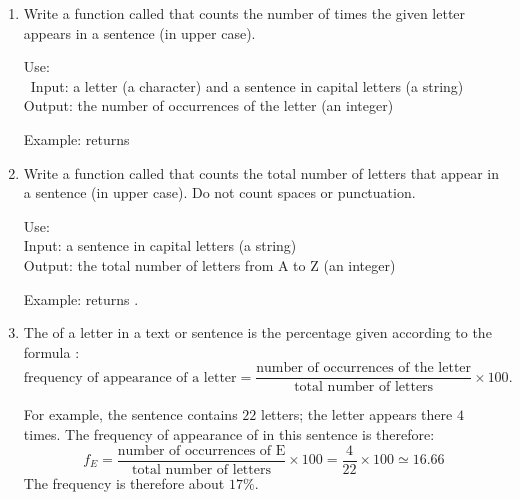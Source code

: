 \documentclass[11pt,class=report,crop=false]{standalone}
\begin{document}
\begin{activite}


\begin{enumerate}
  \item Write a function called  that counts the number of times the given letter appears in a sentence (in upper case).
  
    \begin{fonction}
   Use: \\\
   Input: a letter (a character) and a sentence in capital letters (a string)\\
   Output: the number of occurrences of the letter (an integer)
  
  \medskip
     
   Example:  returns 
  \end{fonction}
  
 \item Write a function called  that counts the total number of letters that appear in a sentence (in upper case). Do not count spaces or punctuation.
 
     \begin{fonction}
   Use: \\
   Input: a sentence in capital letters (a string)\\
   Output: the total number of letters from \og{}A\fg{} to \og{}Z\fg{} (an integer)
  
  \medskip
     
   Example:  returns .
  \end{fonction}
 
 \item The  of a letter in a text or sentence is the percentage given according to the formula :
 $$\text{frequency of appearance of a letter} = \frac{\text{number of occurrences of the letter}}{\text{total number of letters}} \times 100.$$
 
 \medskip
 
 For example, the sentence  contains $22$ letters; 
  the letter  appears there $4$ times. The frequency of appearance of \mot{E} in this sentence is therefore:
  $$f_E = \frac{\text{number of occurrences of E}}{\text{total number of letters}} \times 100  = \frac{4}{22} \times  100 \simeq 16.66$$
 The frequency is therefore about $17\%$.
  

\end{enumerate}
\end{activite}
\end{document}
